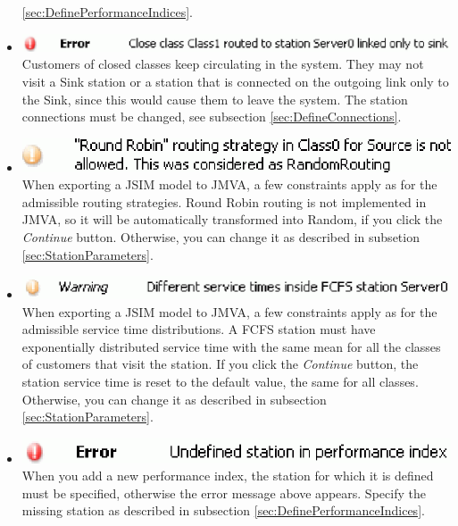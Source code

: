 \begin{description*}
\begin{itemize}
\autoref{sec:DefinePerformanceIndices}.
\item \includegraphics[scale=.5]{img/jsim/11.eps}\\
Customers of closed classes keep circulating in the system. They may not visit a Sink station or a station that is connected on the outgoing link only to the Sink, since this would cause them to leave the system. The station connections must be changed, see subsection \ref{sec:DefineConnections}.
\item \includegraphics[scale=.5]{img/jsim/12.eps}\\
When exporting a JSIM model to JMVA, a few constraints apply as for the admissible routing strategies. Round Robin routing is not implemented in JMVA, so it will be automatically transformed into Random, if you click the \emph{Continue} button. Otherwise, you can change it as described in subsetion \ref{sec:StationParameters}.
\item \includegraphics[scale=.5]{img/jsim/13.eps}\\
When exporting a JSIM model to JMVA, a few constraints apply as for the admissible service time distributions. A FCFS station must have exponentially distributed service time with the same mean for all the classes of customers that visit the station. If you click the \emph{Continue} button, the station service time is 
reset to the default value, the same for all classes. Otherwise, you can change it as described in subsection \ref{sec:StationParameters}.
\item \includegraphics[scale=.5]{img/jsim/14.eps}\\
When you add a new performance index, the station for which it is defined must be specified, otherwise the error message above appears. Specify the missing station as described in subsection  \autoref{sec:DefinePerformanceIndices}.
\end{itemize}


\end{description*}
